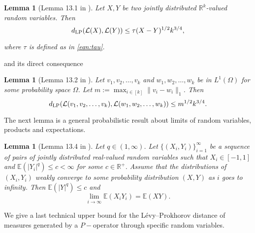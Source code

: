 \documentclass[11pt]{article}
\newtheorem{lemma}[theorem]{Lemma}
\begin{document}
\begin{lemma}[Lemma 13.1 in \cite{backhausz2018action}]\label{coupdist} Let $X,Y$ be two jointly distributed $\mathbb{R}^k$-valued random variables. Then $$d_{\rm LP}(\mathcal{L}(X),\mathcal{L}(Y))\leq \tau(X-Y)^{1/2}k^{3/4},$$

where $\tau$ is defined as in \eqref{eqn:tau}.
\end{lemma}

and its direct consequence

\begin{lemma}[Lemma 13.2 in \cite{backhausz2018action}\label{coupdist2}] Let $v_1,v_2,\dots,v_k$ and $w_1,w_2,\dots,w_k$ be in $L^1(\Omega)$ for some probability space $\Omega$. Let $m:=\max_{i\in [k]} \|v_i-w_i\|_1$. Then
$$d_{\rm LP}(\mathcal{L}(v_1,v_2,\dots,v_k),\mathcal{L}(w_1,w_2,\dots,w_k))\leq m^{1/2}k^{3/4}.$$
\end{lemma} 



The next lemma is a general probabilistic result about limits of random variables, products and expectations.

\begin{lemma}[Lemma 13.4 in \cite{backhausz2018action}]\label{closedlem2} Let $q\in (1,\infty)$.  Let $\{(X_i,Y_i)\}_{i=1}^\infty$ be a sequence of pairs of jointly distributed real-valued random variables such that $X_i\in [-1,1]$ and $\mathbb{E}(|Y_i|^q)\leq c<\infty$ for some $c\in\mathbb{R}^+$. Assume that the distributions of $(X_i,Y_i)$ weakly converge to some probability distribution $(X,Y)$ as $i$ goes to infinity. Then $\mathbb{E}(|Y|^q)\leq c$ and $$\lim_{i\to\infty} \mathbb{E}(X_iY_i)=\mathbb{E}(XY).$$ 
\end{lemma}



We give a last technical upper bound for the Lévy–Prokhorov distance of measures generated by a $P-$operator through specific random variables.
\end{document}
